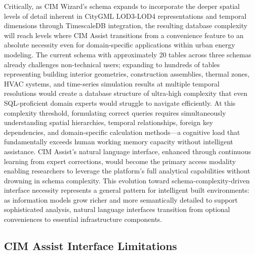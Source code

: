 Critically, as CIM Wizard's schema expands to incorporate the deeper spatial levels of detail inherent in CityGML LOD3-LOD4 representations and temporal dimensions through TimescaleDB integration, the resulting database complexity will reach levels where CIM Assist transitions from a convenience feature to an absolute necessity even for domain-specific applications within urban energy modeling. The current schema with approximately 20 tables across three schemas already challenges non-technical users; expanding to hundreds of tables representing building interior geometries, construction assemblies, thermal zones, HVAC systems, and time-series simulation results at multiple temporal resolutions would create a database structure of ultra-high complexity that even SQL-proficient domain experts would struggle to navigate efficiently. At this complexity threshold, formulating correct queries requires simultaneously understanding spatial hierarchies, temporal relationships, foreign key dependencies, and domain-specific calculation methods—a cognitive load that fundamentally exceeds human working memory capacity without intelligent assistance. CIM Assist's natural language interface, enhanced through continuous learning from expert corrections, would become the primary access modality enabling researchers to leverage the platform's full analytical capabilities without drowning in schema complexity. This evolution toward schema-complexity-driven interface necessity represents a general pattern for intelligent built environments: as information models grow richer and more semantically detailed to support sophisticated analysis, natural language interfaces transition from optional conveniences to essential infrastructure components.

\subsection{CIM Assist Interface Limitations}

